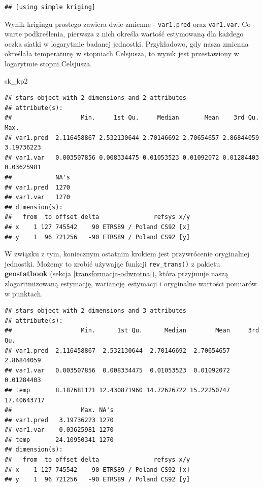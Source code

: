 \documentclass[
  paper=6in:9in,pagesize=pdftex,headinclude=on,footinclude=on,10pt]{scrbook}
\newenvironment{Shaded}{\begin{snugshade}}{\end{snugshade}}
\newcommand{\FunctionTok}[1]{\textcolor[rgb]{0.13,0.29,0.53}{\textbf{#1}}}
\newcommand{\NormalTok}[1]{#1}
\newcommand{\OtherTok}[1]{\textcolor[rgb]{0.56,0.35,0.01}{#1}}
\newcommand{\SpecialCharTok}[1]{\textcolor[rgb]{0.81,0.36,0.00}{\textbf{#1}}}
\begin{document}
\begin{verbatim}
## [using simple kriging]
\end{verbatim}

Wynik krigingu prostego zawiera dwie zmienne - \texttt{var1.pred} oraz \texttt{var1.var}.
Co warte podkreślenia, pierwsza z nich określa wartość estymowaną dla każdego oczka siatki w logarytmie badanej jednostki.
Przykładowo, gdy nasza zmienna określała temperaturę~w stopniach Celsjusza, to wynik jest przestawiony w logarytmie stopni Celsjusza.

\begin{Shaded}
\begin{Highlighting}[]
\NormalTok{sk\_kp2}
\end{Highlighting}
\end{Shaded}

\begin{verbatim}
## stars object with 2 dimensions and 2 attributes
## attribute(s):
##                   Min.     1st Qu.     Median       Mean    3rd Qu.       Max.
## var1.pred  2.116458867 2.532130644 2.70146692 2.70654657 2.86844059 3.19736223
## var1.var   0.003507856 0.008334475 0.01053523 0.01092072 0.01284403 0.03625981
##            NA's
## var1.pred  1270
## var1.var   1270
## dimension(s):
##   from  to offset delta               refsys x/y
## x    1 127 745542    90 ETRS89 / Poland CS92 [x]
## y    1  96 721256   -90 ETRS89 / Poland CS92 [y]
\end{verbatim}

W związku z tym, koniecznym ostatnim krokiem jest przywrócenie oryginalnej jednostki.
Możemy to zrobić używając funkcji \texttt{rev\_trans()} z pakietu \textbf{geostatbook} (sekcja \ref{transformacja-odwrotna}), która przyjmuje naszą zlogaritmizowaną estymację, wariancję~estymacji i oryginalne wartości pomiarów w punktach.

\begin{Shaded}
\end{Shaded}

\begin{verbatim}
## stars object with 2 dimensions and 3 attributes
## attribute(s):
##                   Min.      1st Qu.      Median        Mean     3rd Qu.
## var1.pred  2.116458867  2.532130644  2.70146692  2.70654657  2.86844059
## var1.var   0.003507856  0.008334475  0.01053523  0.01092072  0.01284403
## temp       8.187681121 12.430871960 14.72626722 15.22250747 17.40643717
##                   Max. NA's
## var1.pred   3.19736223 1270
## var1.var    0.03625981 1270
## temp       24.10950341 1270
## dimension(s):
##   from  to offset delta               refsys x/y
## x    1 127 745542    90 ETRS89 / Poland CS92 [x]
## y    1  96 721256   -90 ETRS89 / Poland CS92 [y]
\end{verbatim}
\end{document}
